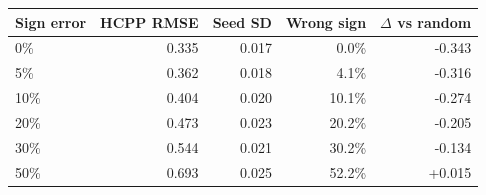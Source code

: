 \begin{tabular}{lrrrr}
\toprule
Sign error & HCPP RMSE & Seed SD & Wrong sign & $\Delta$ vs random \\
\midrule
0\% & 0.335 & 0.017 & 0.0\% & -0.343 \\
5\% & 0.362 & 0.018 & 4.1\% & -0.316 \\
10\% & 0.404 & 0.020 & 10.1\% & -0.274 \\
20\% & 0.473 & 0.023 & 20.2\% & -0.205 \\
30\% & 0.544 & 0.021 & 30.2\% & -0.134 \\
50\% & 0.693 & 0.025 & 52.2\% & +0.015 \\
\bottomrule
\end{tabular}
